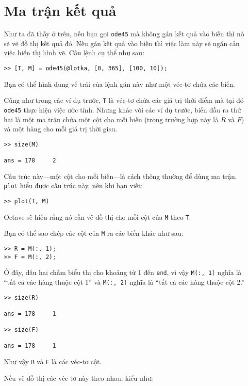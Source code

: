 \documentclass[12pt]{book}
\begin{document}
\section{Ma trận kết quả}

Như ta đã thấy ở trên, nếu bạn gọi {\tt ode45} mà không gán kết quả
vào biến thì nó sẽ vẽ đồ thị kết quả đó. Nếu gán kết quả vào biến
thì việc làm này sẽ ngăn cản việc hiển thị hình vẽ. Câu lệnh cụ thể
như sau:

\begin{verbatim}
>> [T, M] = ode45(@lotka, [0, 365], [100, 10]);
\end{verbatim}
%
Bạn có thể hình dung vế trái của lệnh gán này như một véc-tơ chứa
các biến.

Cũng như trong các ví dụ trước, {\tt T} là véc-tơ chứa các giá trị 
thời điểm mà tại đó {\tt ode45} thực hiện việc ước tính. Nhưng khác
với các ví dụ trước, biến đầu ra thứ hai là một ma trận chứa một cột
cho mỗi biến (trong trường hợp này là $R$ và $F$) và một hàng
cho mỗi giá trị thời gian.

\begin{verbatim}
>> size(M)

ans = 178     2
\end{verbatim}
%
Cấu trúc này---một cột cho mỗi biến---là cách thông thường để
dùng ma trận. {\tt plot} hiểu được cấu trúc này, nên khi bạn viết:

\begin{verbatim}
>> plot(T, M)
\end{verbatim}
%
Octave sẽ hiểu rằng nó cần vẽ đồ thị cho mỗi cột của {\tt M}
theo {\tt T}.

Bạn có thể sao chép các cột của {\tt M} ra các biến khác như sau:

\begin{verbatim}
>> R = M(:, 1);
>> F = M(:, 2);
\end{verbatim}
%
Ở đây, dấu hai chấm biểu thị cho khoảng từ 1 đến {\tt end},
vì vậy {\tt M(:, 1)} nghĩa là ``tất cả các hàng thuộc cột 1'' và
{\tt M(:, 2)} nghĩa là ``tất cả các hàng thuộc cột 2.''

\begin{verbatim}
>> size(R)

ans = 178     1

>> size(F)

ans = 178     1
\end{verbatim}
%
Như vậy {\tt R} và {\tt F} là các véc-tơ cột.

Nếu vẽ đồ thị các véc-tơ này theo nhau, kiểu như:
\end{document}

